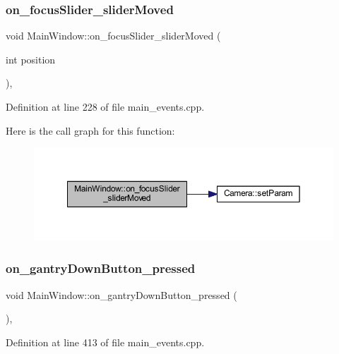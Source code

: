 \subsubsection{\texorpdfstring{on\_focusSlider\_sliderMoved}{on\_focusSlider\_sliderMoved}}
{\footnotesize\ttfamily void Main\+Window\+::on\+\_\+focus\+Slider\+\_\+slider\+Moved (\begin{DoxyParamCaption}\item[{int}]{position }\end{DoxyParamCaption})\hspace{0.3cm}{\ttfamily [private]}, {\ttfamily [slot]}}



Definition at line 228 of file main\+\_\+events.\+cpp.

Here is the call graph for this function\+:
\nopagebreak
\begin{figure}[H]
\begin{center}
\leavevmode
\includegraphics[width=350pt]{classMainWindow_a4984f1218d13c28b7dd40f9e1cc9b9be_cgraph}
\end{center}
\end{figure}
\mbox{\label{classMainWindow_a04c1e4428230f33e991ff87aed62575f}} 
\subsubsection{\texorpdfstring{on\_gantryDownButton\_pressed}{on\_gantryDownButton\_pressed}}
{\footnotesize\ttfamily void Main\+Window\+::on\+\_\+gantry\+Down\+Button\+\_\+pressed (\begin{DoxyParamCaption}{ }\end{DoxyParamCaption})\hspace{0.3cm}{\ttfamily [private]}, {\ttfamily [slot]}}



Definition at line 413 of file main\+\_\+events.\+cpp.

